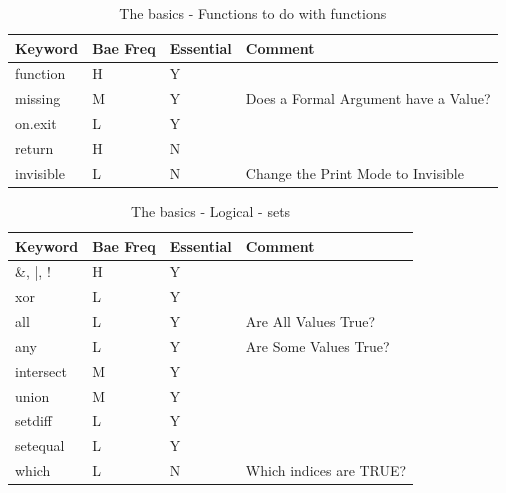\documentclass[10pt,]{krantz}
\theoremstyle{definition}
\theoremstyle{definition}
\theoremstyle{remark}
\begin{document}
\begin{table}

\caption{\label{tab:knitchunk5}The basics - Functions to do with functions}
\centering
\begin{tabular}[t]{llll}
\toprule
Keyword & Bae Freq & Essential & Comment\\
\midrule
function & H & Y & \\
missing & M & Y & Does a Formal Argument have a Value?\\
on.exit & L & Y & \\
return & H & N & \\
invisible & L & N & Change the Print Mode to Invisible\\
\bottomrule
\end{tabular}
\end{table}

\begin{table}

\caption{\label{tab:knitchunk6}The basics - Logical - sets }
\centering
\begin{tabular}[t]{llll}
\toprule
Keyword & Bae Freq & Essential & Comment\\
\midrule
\&, |, ! & H & Y & \\
xor & L & Y & \\
all & L & Y & Are All Values True?\\
any & L & Y & Are Some Values True?\\
intersect & M & Y & \\
\addlinespace
union & M & Y & \\
setdiff & L & Y & \\
setequal & L & Y & \\
which & L & N & Which indices are TRUE?\\
\bottomrule
\end{tabular}
\end{table}
\end{document}
